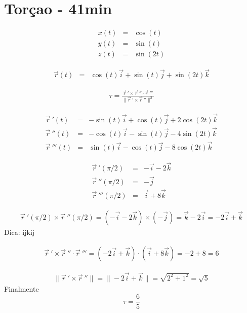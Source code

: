 \documentclass[a4paper,10pt]{article}
\begin{document}
 \section{Torçao - 41min}
 \begin{eqnarray*}
  x(t) &=& \cos(t)\\
  y(t) &=& \sin(t)\\
  z(t) &=& \sin(2t)
 \end{eqnarray*}
 
 \begin{eqnarray*}
  \vec{r}(t) &=& \cos(t)\vec{i}+\sin(t)\vec{j}+ \sin(2t)\vec{k}
 \end{eqnarray*}
 

  \begin{eqnarray*}
\tau = \frac{\vec{r}\!~'\times\vec{r}\!~''\cdot \vec{r}\!~'''}{\|\vec{r}\!~'\times\vec{r}\!~''\|^2}
  \end{eqnarray*}

 \begin{eqnarray*}
  \vec{r}\!~'(t) &=& -\sin(t)\vec{i}+\cos(t)\vec{j}+
  2\cos(2t)\vec{k}\\
  \vec{r}\!~''(t) &=& -\cos(t)\vec{i}-\sin(t)\vec{j}-4\sin(2t)\vec{k}\\
  \vec{r}\!~'''(t) &=& \sin(t)\vec{i}-\cos(t)\vec{j}-
  8\cos(2t)\vec{k}
 \end{eqnarray*}

 \begin{eqnarray*}
  \vec{r}\!~'(\pi/2) &=& -\vec{i}-
  2\vec{k}\\
  \vec{r}\!~''(\pi/2) &=& -\vec{j}\\
  \vec{r}\!~'''(\pi/2) &=& \vec{i}+
  8\vec{k}
 \end{eqnarray*}

 
 \begin{eqnarray*}
\vec{r}\!~'(\pi/2)\times \vec{r}\!~''(\pi/2)=\left(-\vec{i}-
  2\vec{k}\right)\times (-\vec{j})=\vec{k}-2\vec{i}=-2\vec{i}+\vec{k}
  \end{eqnarray*}
 Dica: ijkij
 
\begin{eqnarray*}
   \vec{r}\!~'\times\vec{r}\!~''\cdot \vec{r}\!~'''= \left(-2\vec{i}+\vec{k}\right)\cdot \left(\vec{i}+8\vec{k}\right)= -2+8=6
  \end{eqnarray*}
 

 \begin{eqnarray*}
\|\vec{r}\!~' \times \vec{r}\!~''\|=\|-2\vec{i}+\vec{k}\|=\sqrt{2^2+1^2}=\sqrt{5}
 \end{eqnarray*}
 Finalmente
 $$\tau=\frac{6}{5}$$
\end{document}
